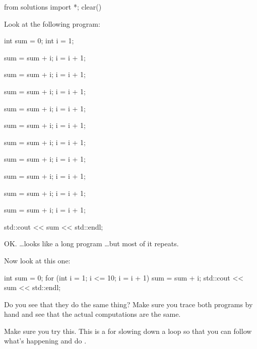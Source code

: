 \begin{python0}
from solutions import *; clear()
\end{python0}

Look at the following program:
\begin{console}
int sum = 0;
int i = 1;

sum = sum + i;
i = i + 1;

sum = sum + i;
i = i + 1;

sum = sum + i;
i = i + 1;

sum = sum + i;
i = i + 1;

sum = sum + i;
i = i + 1;

sum = sum + i;
i = i + 1;

sum = sum + i;
i = i + 1;

sum = sum + i;
i = i + 1;

sum = sum + i;
i = i + 1;

sum = sum + i;
i = i + 1;

std::cout << sum << std::endl;
\end{console}

OK. \ldots looks like a long program \ldots but most of it repeats.

Now look at this one:
\begin{console}
int sum = 0;
for (int i = 1; i <= 10; i = i + 1)
{   
    sum = sum + i;
}
std::cout << sum << std::endl;
\end{console}

Do you see that they do the same thing? Make sure you trace both
programs by hand and see that the actual computations are the same.


Make sure you try this. This is a  for
slowing down a loop so that you can follow what's
happening and do .

